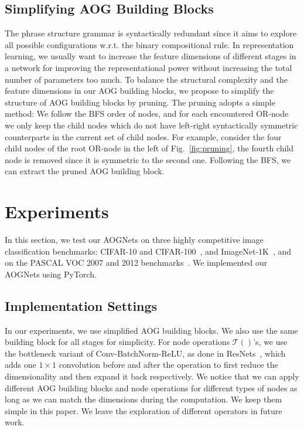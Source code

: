 \documentclass[10pt,twocolumn,letterpaper]{article}
\begin{document}
\subsection{Simplifying AOG Building Blocks} 
The phrase structure grammar is syntactically redundant since it aims to explore all possible configurations w.r.t. the binary compositional rule. In representation learning, we usually want to increase the feature dimensions of different stages in a network for improving the representational power without increasing the total number of parameters too much. To balance the structural complexity and the feature dimensions in our AOG building blocks, we propose to simplify the structure of AOG building blocks by pruning. The pruning adopts a simple method: We follow the BFS order of nodes, and for each encountered OR-node we only keep the child nodes which do not have left-right syntactically symmetric counterparts in the current set of child nodes. For example, consider the four child nodes of the root OR-node in the left of Fig.~\ref{fig:pruning}, the fourth child node is removed since it is symmetric to the second one. Following the BFS, we can extract the pruned AOG building block. 







\section{Experiments}\label{sec:Exp}
In this section, we test our AOGNets on three highly competitive image classification benchmarks: CIFAR-10 and CIFAR-100~\cite{CIFAR}, and ImageNet-1K~\cite{ImageNet},  and on the PASCAL VOC 2007 and 2012 benchmarks~\cite{VOC}. We implemented our AOGNets using PyTorch. %

\subsection{Implementation Settings}
In our experiments, we use simplified AOG building blocks. We also use the same building block for all stages for simplicity. For node operations $\mathcal{T}()$'s, we use the bottleneck %
variant of Conv-BatchNorm-ReLU,  as done in ResNets~\cite{ResidualNet}, which adds one $1\times 1$ convolution before and after the operation to first reduce the dimensionality and then expand it back respectively. We notice that we can apply different AOG building blocks and node operations for different types of nodes as long as we can match the dimensions during the computation. We keep them simple in this paper. We leave the exploration of different operators in future work.   
\end{document}
